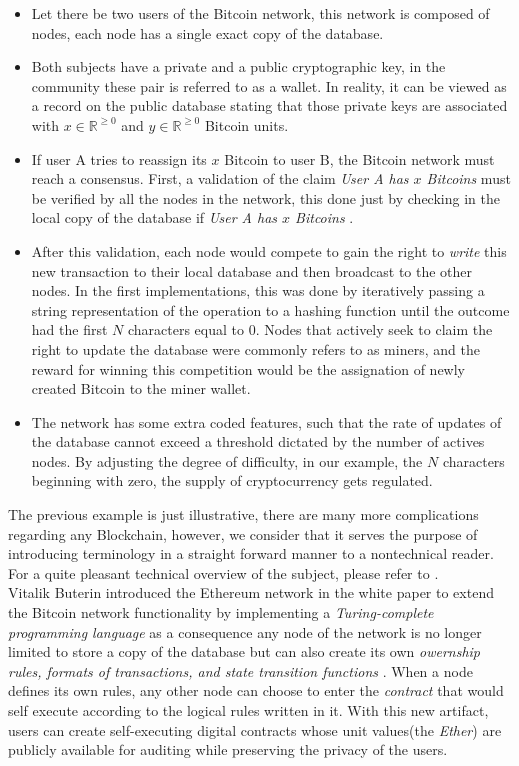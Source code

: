 \begin{itemize}
	\item Let there be two users of the Bitcoin network, this network is composed of nodes, each node has a single exact copy of the database. 
	\item Both subjects have a private and a public cryptographic key, in the community these pair is referred to as a wallet. In reality, it can be viewed as a record on the public database stating that those private keys are associated with $x \in \mathbb{R}^{\geq0}$ and $y \in \mathbb{R}^{\geq0}$  Bitcoin units.
	\item If user A tries to reassign its $x$ Bitcoin to user B, the Bitcoin network must reach a consensus. First, a validation of the claim \emph{User A has $x$ Bitcoins} must be verified by all the nodes in the network, this done just by checking in the local copy of the database if \emph{User A has $x$ Bitcoins} .
	\item After this validation, each node would compete to gain the right to \emph{write} this new transaction to their local database and then broadcast to the other nodes. In the first implementations, this was done by iteratively passing a string representation of the operation to a hashing function until the outcome had the first $N$ characters equal to 0. Nodes that actively seek to claim the right to update the database were commonly refers to as miners, and the reward for winning this competition would be the assignation of newly created Bitcoin to the miner wallet.
	\item The network has some extra coded features, such that the rate of updates of the database cannot exceed a threshold dictated by the number of actives nodes. By adjusting the degree of difficulty, in our example, the $N$ characters beginning with zero, the supply of cryptocurrency gets regulated. 
\end{itemize}

The previous example is just illustrative, there are many more complications regarding any Blockchain, however, we consider that it serves the purpose of introducing terminology in a straight forward manner to a nontechnical reader. For a quite pleasant technical overview of the subject, please refer to \cite{vujivcic2018blockchain}.\\

Vitalik Buterin introduced the Ethereum network in the white paper \cite{buterin2014ethereum} to extend the   Bitcoin network functionality by implementing a \emph{Turing-complete programming  language} as a consequence any node of the network is no longer limited to store a copy of the database but can also create its own \emph{owernship rules, formats of  transactions,  and  state  transition  functions} \cite{vujivcic2018blockchain}. When a node defines its own rules, any other node can choose to enter the \emph{contract} that would self execute according to the logical rules written in it. With this new artifact, users can create self-executing digital contracts whose unit values(the \emph{Ether}) are publicly available for auditing while preserving the privacy of the users.\\

